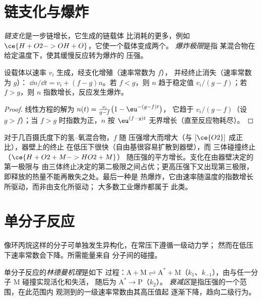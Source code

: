 \section{链支化与爆炸}

\begin{definition}\label{def:b3:complex-kinetics:branching}
\emph{链支化}是一步链增长，它生成的链载体
比消耗的更多，例如 $\ce{H + O2 -> OH + O}$，它使一个载体变成两个。
\emph{爆炸极限}是指
某混合物在给定温度下，使其缓慢反应转为爆炸的
压强。
\end{definition}

\begin{proposition}[支化判据]\label{prop:b3:complex-kinetics:branching}
设载体以速率 $v_i$ 生成，经支化增殖（速率常数为 $f$），
并经终止消失（速率常数为 $g$）：
$\dd n/\dd t = v_i + (f - g)n$。若 $f < g$，则 $n$ 趋于稳定值 $v_i/(g - f)$；若
$f > g$，则 $n$ 指数增长，反应发生爆炸。
\end{proposition}

\begin{proof}
线性方程的解为 $n(t) = \frac{v_i}{g - f}\bigl(1 - \eu^{-(g - f)t}\bigr)$，
它趋于 $v_i/(g - f)$（设 $g > f$）；当 $f > g$ 时指数为正，$n$
按 $\eu^{(f - g)t}$ 无界增长（直至反应物耗尽）。
\end{proof}

对于几百摄氏度下的氢–氧混合物，$f$ 随
压强增大而增大（与 $[\ce{O2}]$ 成正比），器壁上的终止
在低压下很快（自由基很容易扩散到器壁），而
三体碰撞终止（$\ce{H + O2 + M -> HO2 + M}$）
随压强的平方增长。支化在由器壁决定的第一极限与
由三体终止决定的第二极限之间占优；更高压强下又出现第三极限，
即释放的热量不能再散失之处。最后一种是
热爆炸，它由速率随温度的指数增长所驱动，而非由支化所驱动；
大多数工业爆炸都属于
此类。

\section{单分子反应}

像环丙烷这样的分子可单独发生异构化，在常压下遵循一级动力学；
然而在低压下速率常数会下降。所需能量来自
分子间的碰撞。

\begin{definition}\label{def:b3:complex-kinetics:lindemann}
单分子反应的\emph{林德曼机理}是如下
过程：$\mathrm{A + M \rightleftharpoons A^* + M}$（$k_1$、$k_{-1}$），由与任一分子 M 碰撞实现活化和失活，
随后为 $\mathrm{A^* \to P}$（$k_2$）。
\emph{衰减区}是指压强的一个范围，在此范围内
观测到的一级速率常数由其高压值起
逐渐下降，趋向二级行为。
\end{definition}

